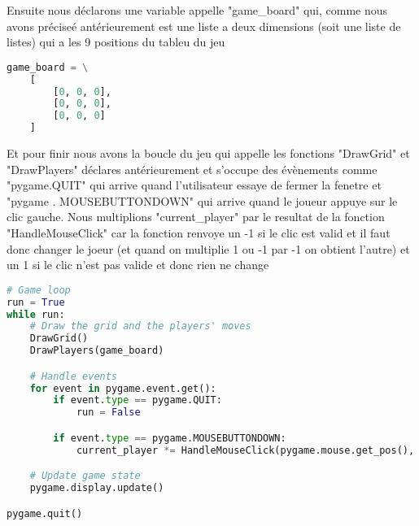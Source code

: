 \documentclass[12pt]{article}
\begin{document}
Ensuite nous déclarons une variable appelle "game\_board" qui, comme nous avons préciseé antérieurement est une liste a deux dimensions (soit une liste de listes) qui a les 9 positions du tableu du jeu
   \begin{lstlisting}[language=Python]
game_board = \
    [
        [0, 0, 0],
        [0, 0, 0],
        [0, 0, 0]
    ] \end{lstlisting}

\newpage
Et pour finir nous avons la boucle du jeu qui appelle les fonctions "DrawGrid" et "DrawPlayers" déclares antérieurement et s'occupe des évènements comme "pygame.QUIT" qui arrive quand l'utilisateur essaye de fermer la fenetre et "pygame . MOUSEBUTTONDOWN" qui arrive quand le joueur appuye sur le clic gauche. Nous multiplions "current\_player" par le resultat de la fonction "HandleMouseClick" car la fonction renvoye un -1 si le clic est valid et il faut donc changer le joeur (et quand on multiplie 1 ou -1 par -1 on obtient l'autre) et un 1 si le clic n'est pas valide et donc rien ne change
    \begin{lstlisting}[language=Python]
# Game loop
run = True
while run:
    # Draw the grid and the players' moves
    DrawGrid()
    DrawPlayers(game_board)

    # Handle events
    for event in pygame.event.get():
        if event.type == pygame.QUIT:
            run = False

        if event.type == pygame.MOUSEBUTTONDOWN:
            current_player *= HandleMouseClick(pygame.mouse.get_pos(), game_board, current_player, played_plus_last_round)

    # Update game state
    pygame.display.update()

pygame.quit() \end{lstlisting}
\end{document}
